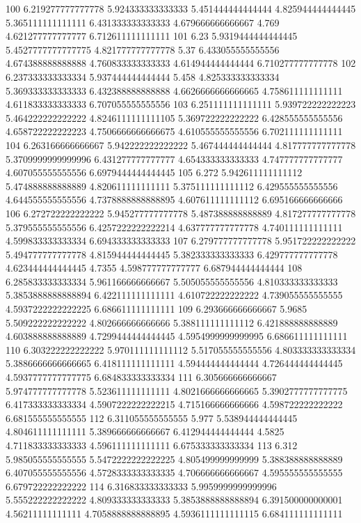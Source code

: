 100 6.219277777777778 5.924333333333333 5.451444444444444 4.825944444444445 5.365111111111111 6.431333333333333 4.679666666666667 4.769 4.621277777777777 6.712611111111111
101 6.23 5.9319444444444445 5.4527777777777775 4.821777777777778 5.37 6.433055555555556 4.674388888888888 4.760833333333333 4.614944444444444 6.710277777777778
102 6.237333333333334 5.937444444444444 5.458 4.825333333333334 5.369333333333333 6.432388888888888 4.6626666666666665 4.758611111111111 4.611833333333333 6.707055555555556
103 6.251111111111111 5.939722222222223 5.464222222222222 4.8246111111111105 5.369722222222222 6.428555555555556 4.658722222222223 4.7506666666666675 4.610555555555556 6.702111111111111
104 6.263166666666667 5.942222222222222 5.467444444444444 4.817777777777778 5.3709999999999996 6.431277777777777 4.654333333333333 4.747777777777777 4.607055555555556 6.6979444444444445
105 6.272 5.942611111111112 5.474888888888889 4.820611111111111 5.375111111111112 6.429555555555556 4.644555555555556 4.7378888888888895 4.607611111111112 6.695166666666666
106 6.272722222222222 5.945277777777778 5.487388888888889 4.817277777777778 5.379555555555556 6.4257222222222214 4.637777777777778 4.740111111111111 4.599833333333334 6.694333333333333
107 6.279777777777778 5.951722222222222 5.494777777777778 4.815944444444445 5.382333333333333 6.429777777777778 4.623444444444445 4.7355 4.598777777777777 6.687944444444444
108 6.285833333333334 5.961166666666667 5.505055555555556 4.810333333333333 5.3853888888888894 6.422111111111111 4.610722222222222 4.739055555555555 4.5937222222222225 6.686611111111111
109 6.293666666666667 5.9685 5.509222222222222 4.802666666666666 5.388111111111112 6.421888888888889 4.603888888888889 4.7299444444444445 4.5954999999999995 6.686611111111111
110 6.303222222222222 5.970111111111112 5.517055555555556 4.803333333333334 5.3886666666666665 6.418111111111111 4.594444444444444 4.726444444444445 4.5937777777777775 6.684833333333334
111 6.305666666666667 5.974777777777778 5.523611111111111 4.8021666666666665 5.3902777777777775 6.417333333333334 4.5907222222222215 4.715166666666666 4.598722222222222 6.681555555555555
112 6.311055555555555 5.977 5.538944444444445 4.804611111111111 5.389666666666667 6.412944444444444 4.5825 4.711833333333333 4.596111111111111 6.675333333333334
113 6.312 5.985055555555555 5.5472222222222225 4.805499999999999 5.388388888888889 6.407055555555556 4.5728333333333335 4.706666666666667 4.595555555555555 6.679722222222222
114 6.316833333333333 5.9959999999999996 5.555222222222222 4.809333333333333 5.3853888888888894 6.391500000000001 4.56211111111111 4.7058888888888895 4.5936111111111115 6.684111111111111
